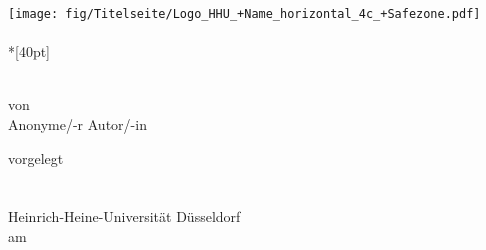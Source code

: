 \begin{titlepage}
    \centering
    \texttt{[image: fig/Titelseite/Logo\_HHU\_+Name\_horizontal\_4c\_+Safezone.pdf]}\\

    \vfill
    \Huge
    \moduleTitle{}\\*[40pt]
    \normalsize

    
    \huge
    \exerciseTitle{}\\[0.25em]
    \normalsize
    von\\
    \Large
    {Anonyme/-r Autor/-in}  %
    {\excerciseAuthor{}}       %
    \\

    \vfill


    vorgelegt\\[5mm]
    \supervisor{}\\
    \moduleFaculty{}\\
    Heinrich-Heine-Universität Düsseldorf\\[0.5cm]

    am\\
    \monthtoday{}\\[0.5cm]

\end{titlepage}

